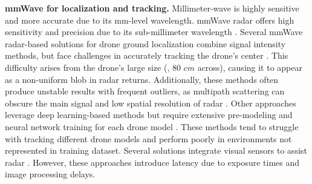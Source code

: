 \textbf{mmWave for localization and tracking.}
Millimeter-wave is highly sensitive and more accurate due to its mm-level wavelength.
mmWave radar offers high sensitivity and precision due to its sub-millimeter wavelength \cite{Harlow_2024,s23218901,lu2020smokerobustindoormapping}. 
Several mmWave radar-based solutions for drone ground localization combine signal intensity methods, but face challenges in accurately tracking the drone's center \cite{qian20203d, asi6040068, 10.1145/3678549}. 
This difficulty arises from the drone's large size (\eg, 80 $cm$ across), causing it to appear as a non-uniform blob in radar returns. 
Additionally, these methods often produce unstable results with frequent outliers, as multipath scattering can obscure the main signal and low spatial resolution of radar \cite{Li2024AHH}.
Other approaches leverage deep learning-based methods but require extensive pre-modeling and neural network training for each drone model \cite{lu2020see, zheng2023neuroradar, ALLQUBAYDHI2024100614}. 
These methods tend to struggle with tracking different drone models and perform poorly in environments not represented in training dataset. 
Several solutions integrate visual sensors to assist radar \cite{shuai2021millieye,chadwick2019distant, cho2014multi}. 
However, these approaches introduce latency due to exposure times and image processing delays.

